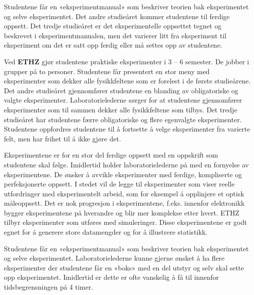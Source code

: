 \documentclass{article}
\begin{document}
Studentene får en «eksperimentmanual» som beskriver teorien bak eksperimentet og selve eksperimentet. Det andre studieåret kommer studentene til ferdige oppsett. Det tredje studieåret er det eksperimentelle oppsettet tegnet og beskrevet i eksperimentmanualen, men det varierer litt fra eksperiment til eksperiment om det er satt opp ferdig eller må settes opp av studentene. 

Ved \textbf{ETHZ} gjør studentene praktiske eksperimenter i 3 – 6 semester. De jobber i grupper på to personer. Studentene får presentert en stor meny med eksperimenter som dekker alle fysikkfeltene som er forelest i de første studieårene. Det andre studieåret gjennomfører studentene en blanding av obligatoriske og valgte eksperimenter. Laboratorielederne sørger for at studentene gjennomfører eksperimenter som til sammen dekker alle fysikkfeltene som tilbys.  Det tredje studieåret har studentene færre obligatoriske og flere egenvalgte eksperimenter. Studentene oppfordres studentene til å fortsette å velge eksperimenter fra varierte felt, men har frihet til å ikke gjøre det.

Eksperimentene er for en stor del ferdige oppsett med en oppskrift som studentene skal følge. Imidlertid holder laboratorielederne på med en fornyelse av eksperimentene. De ønsker å avvikle eksperimenter med ferdige, kompliserte og perfeksjonerte oppsett. I stedet vil de legge til eksperimenter som viser reelle utfordringer med eksperimentelt arbeid, som for eksempel å opplinjere et optisk måleoppsett. Det er nok progresjon i eksperimentene, f.eks. innenfor elektronikk bygger eksperimentene på hverandre og blir mer komplekse etter hvert. ETHZ tilbyr eksperimenter som utføres med simuleringer. Disse eksperimentene er godt egnet for å generere store datamengder og for å illustrere statistikk. 

Studentene får en «eksperimentmanual» som beskriver teorien bak eksperimentet og selve eksperimentet. Laboratorielederne kunne gjerne ønsket å ha flere eksperimenter der studentene får en «boks» med en del utstyr og selv skal sette opp eksperimentet. Imidlertid er dette er ofte vanskelig å få til innenfor tidsbegrensningen på 4 timer.
\end{document}
